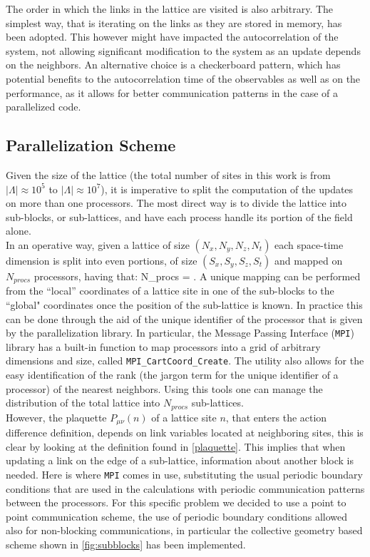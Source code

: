 The order in which the links in the lattice are visited is also arbitrary. The simplest way, that is iterating on the links as they are stored in memory, has been adopted. This however might have impacted the autocorrelation of the system, not allowing significant modification to the system as an update depends on the neighbors. An alternative choice is a checkerboard pattern, which has potential benefits to the autocorrelation time of the observables as well as on the performance, as it allows for better communication patterns in the case of a parallelized code. 

\subsection{Parallelization Scheme}
\label{sec:para_gen}
Given the size of the lattice (the total number of sites in this work is from $|\Lambda| \approx 10^5$ to $|\Lambda|\approx 10^7$), it is imperative to split the computation of the updates on more than one processors. The most direct way is to divide the lattice into sub-blocks, or sub-lattices, and have each process handle its portion of the field alone. \\
In an operative way, given a lattice of size $(N_x, N_y, N_z, N_t)$ each space-time dimension is split into even portions, of size $(S_x, S_y, S_z, S_t)$ and mapped on $N_{procs}$ processors, having that:
\beq
N_{procs} =  \times {} \times {}  \times {}.
\eeq 
A unique mapping can be performed from the ``local'' coordinates of a lattice site in one of the sub-blocks to the ``global" coordinates once the position of the sub-lattice is known. In practice this can be done through the aid of the unique identifier of the processor that is given by the parallelization library. In particular, the Message Passing Interface (\texttt{MPI}) \cite{Forum:1994:MMI:898758} library has a built-in function to map processors into a grid of arbitrary dimensions and size, called \texttt{MPI\_CartCoord\_Create}. The utility also allows for the easy identification of the rank (the jargon term for the unique identifier of a processor) of the nearest neighbors. Using this tools one can manage the distribution of the total lattice into $N_{procs}$ sub-lattices. \\
However, the plaquette $P_{\mu\nu}(n)$ of a lattice site $n$, that enters the action difference definition, depends on link variables located at neighboring sites, this is clear by looking at the definition found in \cref{plaquette}. This implies that when updating a link on the edge of a sub-lattice, information about another block is needed. Here is where \texttt{MPI} comes in use, substituting the usual periodic boundary conditions that are used in the calculations with periodic communication patterns between the processors. For this specific problem we decided to use a point to point communication scheme, the use of periodic boundary conditions allowed also for non-blocking communications, in particular the collective geometry based scheme shown in \cref{fig:subblocks} has been implemented. 

